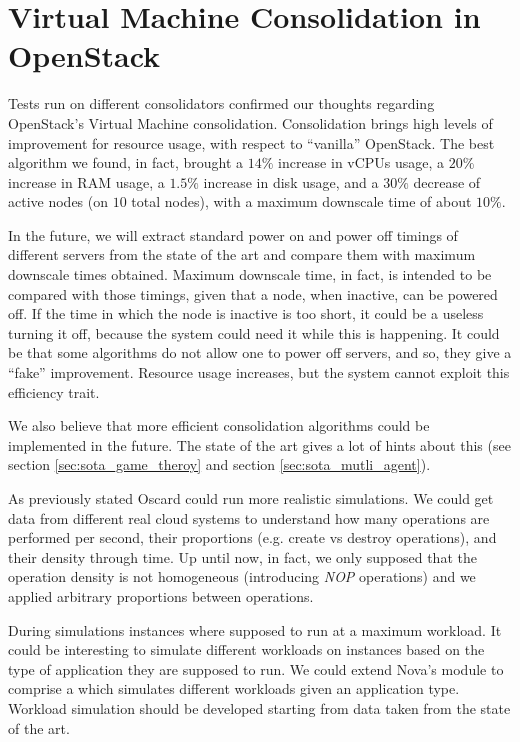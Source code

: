 \section{Virtual Machine Consolidation in OpenStack}
\label{sec:conc_cons}
Tests run on different consolidators confirmed our thoughts regarding OpenStack's Virtual Machine consolidation. Consolidation brings high levels of improvement for resource usage, with respect to ``vanilla'' OpenStack. The best algorithm we found, in fact, brought a $14\%$ increase in vCPUs usage, a $20\%$ increase in RAM usage, a $1.5\%$ increase in disk usage, and a $30\%$ decrease of active nodes (on $10$ total nodes), with a maximum downscale time of about $10\%$.

In the future, we will extract standard power on and power off timings of different servers from the state of the art and compare them with maximum downscale times obtained. Maximum downscale time, in fact, is intended to be compared with those timings, given that a node, when inactive, can be powered off. If the time in which the node is inactive is too short, it could be a useless turning it off, because the system could need it while this is happening. It could be that some algorithms do not allow one to power off servers, and so, they give a ``fake'' improvement. Resource usage increases, but the system cannot exploit this efficiency trait.

We also believe that more efficient consolidation algorithms could be implemented in the future. The state of the art gives a lot of hints about this (see section \ref{sec:sota_game_theroy} and section \ref{sec:sota_mutli_agent}). 

As previously stated Oscard could run more realistic simulations. We could get data from different real cloud systems to understand how many operations are performed per second, their proportions (e.g. create vs destroy operations), and their density through time. Up until now, in fact, we only supposed that the operation density is not homogeneous (introducing \textit{NOP} operations) and we applied arbitrary proportions between operations.

During simulations instances where supposed to run at a maximum workload. It could be interesting to simulate different workloads on instances based on the type of application they are supposed to run. We could extend Nova's  module to comprise a  which simulates different workloads given an application type. Workload simulation should be developed starting from data taken from the state of the art.

